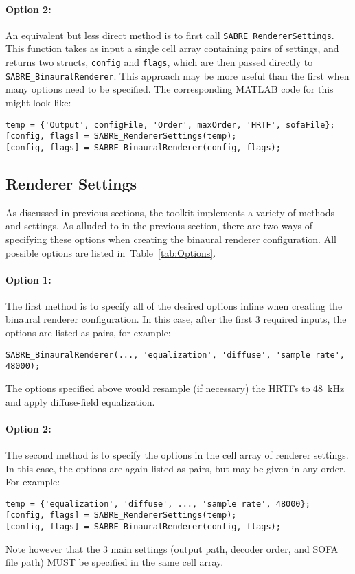 \documentclass[11pt, oneside]{article}
\newcommand{\tabref}[1]{Table~\ref{#1}}
\begin{document}
\paragraph{Option 2:} An equivalent but less direct method is to first call \texttt{SABRE\_RendererSettings}.
This function takes as input a single cell array containing pairs of settings, and returns two structs,
\texttt{config} and \texttt{flags}, which are then passed directly to \texttt{SABRE\_BinauralRenderer}.
This approach may be more useful than the first when many options need to be specified.
The corresponding MATLAB code for this might look like:
\begin{verbatim}
temp = {'Output', configFile, 'Order', maxOrder, 'HRTF', sofaFile};
[config, flags] = SABRE_RendererSettings(temp);
[config, flags] = SABRE_BinauralRenderer(config, flags);
\end{verbatim}

\subsection{Renderer Settings}\label{sec:Options}
As discussed in previous sections, the toolkit implements a variety of methods and settings.
As alluded to in the previous section, there are two ways of specifying these options when creating the binaural renderer configuration.
All possible options are listed in~\tabref{tab:Options}.
\paragraph{Option 1:} The first method is to specify all of the desired options inline when creating the binaural renderer configuration.
In this case, after the first 3 required inputs, the options are listed as pairs, for example:
\begin{verbatim}
SABRE_BinauralRenderer(..., 'equalization', 'diffuse', 'sample rate', 48000);
\end{verbatim}
The options specified above would resample (if necessary) the HRTFs to 48~kHz and apply diffuse-field equalization.

\paragraph{Option 2:} The second method is to specify the options in the cell array of renderer settings.
In this case, the options are again listed as pairs, but may be given in any order. For example:
\begin{verbatim}
temp = {'equalization', 'diffuse', ..., 'sample rate', 48000};
[config, flags] = SABRE_RendererSettings(temp);
[config, flags] = SABRE_BinauralRenderer(config, flags);
\end{verbatim}
Note however that the 3 main settings (output path, decoder order, and SOFA file path) MUST be specified in the same cell array.
\end{document}

